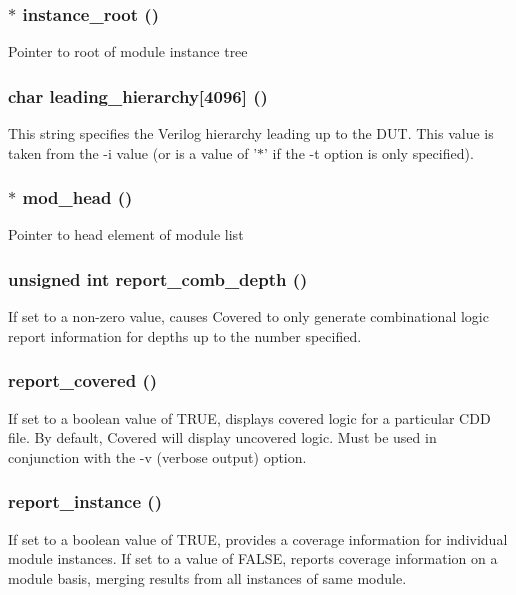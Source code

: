\subsubsection{$\ast$ {\bf instance\_\-root} ()}\label{line_8c_a0}


Pointer to root of module instance tree 
\subsubsection{\setlength{\rightskip}{0pt plus 5cm}char {\bf leading\_\-hierarchy}[4096] ()}\label{line_8c_a5}


This string specifies the Verilog hierarchy leading up to the DUT. This value is taken from the -i value (or is a value of '$\ast$' if the -t option is only specified). 
\subsubsection{$\ast$ {\bf mod\_\-head} ()}\label{line_8c_a1}


Pointer to head element of module list 
\subsubsection{\setlength{\rightskip}{0pt plus 5cm}unsigned int {\bf report\_\-comb\_\-depth} ()}\label{line_8c_a3}


If set to a non-zero value, causes Covered to only generate combinational logic report information for depths up to the number specified. 
\subsubsection{ {\bf report\_\-covered} ()}\label{line_8c_a2}


If set to a boolean value of TRUE, displays covered logic for a particular CDD file. By default, Covered will display uncovered logic. Must be used in conjunction with the -v (verbose output) option. 
\subsubsection{ {\bf report\_\-instance} ()}\label{line_8c_a4}


If set to a boolean value of TRUE, provides a coverage information for individual module instances. If set to a value of FALSE, reports coverage information on a module basis, merging results from all instances of same module. 